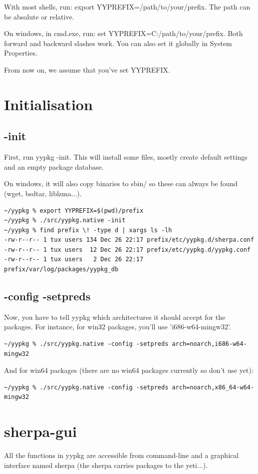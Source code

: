 \documentclass[a4paper]{article}
\begin{document}
With most shells, run: export YYPREFIX=/path/to/your/prefix. The path can be absolute or relative.

On windows, in cmd.exe, run: set YYPREFIX=C:/path/to/your/prefix. Both forward and backward slashes work. You can also set it globally in System Properties.

From now on, we assume that you've set YYPREFIX.

\section{Initialisation}
\subsection{-init}
First, run yypkg -init. This will install some files, mostly create default settings and an empty package database.

On windows, it will also copy binaries to sbin/ so these can always be found (wget, bsdtar, liblzma...).

\begin{verbatim}
~/yypkg % export YYPREFIX=$(pwd)/prefix
~/yypkg % ./src/yypkg.native -init
~/yypkg % find prefix \! -type d | xargs ls -lh         
-rw-r--r-- 1 tux users 134 Dec 26 22:17 prefix/etc/yypkg.d/sherpa.conf
-rw-r--r-- 1 tux users  12 Dec 26 22:17 prefix/etc/yypkg.d/yypkg.conf
-rw-r--r-- 1 tux users   2 Dec 26 22:17 prefix/var/log/packages/yypkg_db
\end{verbatim}

\subsection{-config -setpreds}
Now, you have to tell yypkg which architectures it should accept for the packages. For instance, for win32 packages, you'll use 'i686-w64-mingw32'.
\begin{verbatim}
~/yypkg % ./src/yypkg.native -config -setpreds arch=noarch,i686-w64-mingw32
\end{verbatim}

And for win64 packages (there are no win64 packages currently so don't use yet):

\begin{verbatim}
~/yypkg % ./src/yypkg.native -config -setpreds arch=noarch,x86_64-w64-mingw32
\end{verbatim}

\section{sherpa-gui}
All the functions in yypkg are accessible from command-line and a graphical interface named sherpa (the sherpa carries packages to the yeti...).
\end{document}
